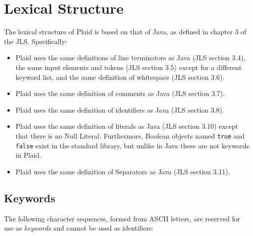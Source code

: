 \section{Lexical Structure}

The lexical structure of Plaid is based on that of Java, as defined in
chapter 3 of the JLS.  Specifically:

\begin{itemize}



\item Plaid uses the same definitions of line terminators as Java (JLS
  section 3.4), the same input elements and tokens (JLS section 3.5)
  except for a different keyword list, and the same definition of
  whitespace (JLS section 3.6).

\item Plaid uses the same definition of comments as Java (JLS section 3.7).

\item Plaid uses the same definition of identifiers as Java (JLS section 3.8).

\item Plaid uses the same definition of literals as Java (JLS section
  3.10) except that there is no Null Literal.  Furthermore, Boolean
  objects named \texttt{true} and \texttt{false} exist in the standard
  library, but unlike in Java these are not keywords in Plaid.

\item Plaid uses the same definition of Separators as Java (JLS section 3.11).

\end{itemize}


\subsection{Keywords}

The following character sequences, formed from ASCII letters, are reserved
for use as \textit{keywords} and cannot be used as identifiers:

